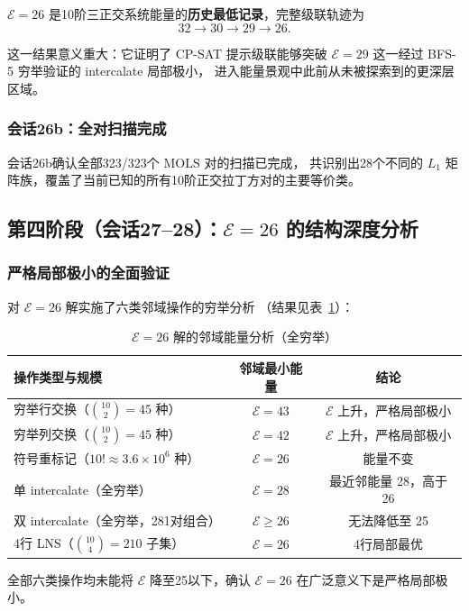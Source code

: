 \documentclass[11pt,a4paper]{ctexart}
\theoremstyle{remark}
\newcommand{\E}{\mathcal{E}}
\newcommand{\MOLS}{\mathrm{MOLS}}
\begin{document}
$\E = 26$ 是10阶三正交系统能量的\textbf{历史最低记录}，完整级联轨迹为
\[
  32 \to 30 \to 29 \to 26.
\]

这一结果意义重大：它证明了 CP-SAT 提示级联能够突破 $\E = 29$
这一经过 BFS-5 穷举验证的 intercalate 局部极小，
进入能量景观中此前从未被探索到的更深层区域。

\subsubsection{会话26b：全对扫描完成}

会话26b确认全部323/323个 $\MOLS$ 对的扫描已完成，
共识别出28个不同的 $L_1$ 矩阵族，覆盖了当前已知的所有10阶正交拉丁方对的主要等价类。

\subsection{第四阶段（会话27--28）：$\E = 26$ 的结构深度分析}

\subsubsection{严格局部极小的全面验证}

对 $\E = 26$ 解实施了六类邻域操作的穷举分析
（结果见表~\ref{tab:e26-neighborhood}）：

\begin{table}[htbp]
  \centering
  \caption{$\E = 26$ 解的邻域能量分析（全穷举）}
  \label{tab:e26-neighborhood}
  \begin{tabular}{lcc}
    \toprule
    操作类型与规模 & 邻域最小能量 & 结论 \\
    \midrule
    穷举行交换（$\binom{10}{2} = 45$ 种） & $\E = 43$ & $\E$ 上升，严格局部极小 \\
    穷举列交换（$\binom{10}{2} = 45$ 种） & $\E = 42$ & $\E$ 上升，严格局部极小 \\
    符号重标记（$10! \approx 3.6 \times 10^6$ 种） & $\E = 26$ & 能量不变 \\
    单 intercalate（全穷举） & $\E = 28$ & 最近邻能量 28，高于 26 \\
    双 intercalate（全穷举，281对组合） & $\E \ge 26$ & 无法降低至 25 \\
    4行 LNS（$\binom{10}{4} = 210$ 子集） & $\E = 26$ & 4行局部最优 \\
    \bottomrule
  \end{tabular}
\end{table}

全部六类操作均未能将 $\E$ 降至25以下，确认 $\E = 26$ 在广泛意义下是严格局部极小。
\end{document}
